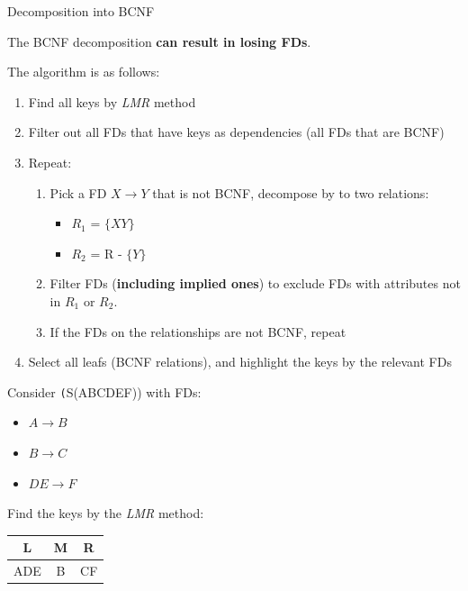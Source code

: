 \begin{theorem}
    {Decomposition into BCNF}

    The BCNF decomposition \textbf{can result in losing FDs}.

    The algorithm is as follows:

    \begin{enumerate}
        \item Find all keys by \textit{LMR} method
        \item Filter out all FDs that have keys as dependencies (all FDs that are BCNF)
        \item Repeat:
              \begin{enumerate}
                  \item Pick a FD $X \to Y$ that is not BCNF, decompose by to two relations:
                        \begin{itemize}
                            \item $R_1$ = $\{XY\}$
                            \item $R_2$ = R - $\{Y\}$
                        \end{itemize}
                  \item Filter FDs (\textbf{including implied ones}) to exclude FDs with attributes not in $R_1$ or $R_2$.
                  \item If the FDs on the relationships are not BCNF, repeat
              \end{enumerate}
        \item Select all leafs (BCNF relations), and highlight the keys by the relevant FDs
    \end{enumerate}

    \tcblower

    Consider \texttt(S(ABCDEF)) with FDs:
    \begin{itemize}
        \item $A \to B$
        \item $B \to C$
        \item $DE \to F$
    \end{itemize}
    Find the keys by the \textit{LMR} method:
    \begin{tabular}{c|c|c}
        L   & M & R  \\
        \hline
        ADE & B & CF \\
    \end{tabular}


\end{theorem}
